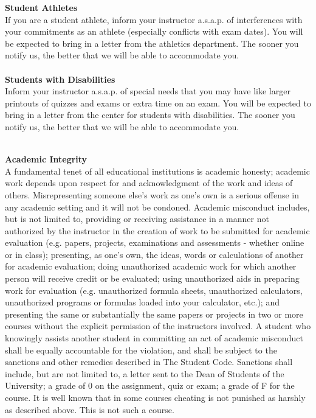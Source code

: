 \documentclass [11pt]{article}
\begin{document}
   {\bf Student Athletes}\\
   If you are a student athlete, inform your instructor a.s.a.p. of
   interferences with your commitments as an athlete (especially
   conflicts with exam dates). You will be expected to bring in a
   letter from the athletics department. The sooner you notify us, the
   better that we will be able to accommodate you.\\
   \ \\

   {\bf Students with Disabilities}\\
   Inform your instructor a.s.a.p. of special needs that you may have like
   larger printouts of quizzes and exams or extra time on an exam.
   You will be expected to bring in a letter from the center for students 
   with disabilities. The sooner you notify us, the better that we will 
   be able to accommodate you.\\
   \ \\

   \vfill\eject

   {\bf Academic Integrity}\\
   A fundamental tenet of all educational institutions is academic
   honesty; academic work depends upon respect for and acknowledgment of
   the work and ideas of others. Misrepresenting someone else's work as
   one's own is a serious offense in any academic setting and it will not
   be condoned.
   Academic misconduct includes, but is not limited to, providing or
   receiving assistance in a manner not authorized by the instructor in
   the creation of work to be submitted for academic evaluation (e.g.
   papers, projects, examinations and assessments - whether online or in
   class); presenting, as one's own, the ideas, words or calculations of
   another for academic evaluation; doing unauthorized academic work for
   which another person will receive credit or be evaluated; using
   unauthorized aids in preparing work for evaluation (e.g. unauthorized
   formula sheets, unauthorized calculators, unauthorized programs or
   formulas loaded into your calculator, etc.); and presenting the same
   or substantially the same papers or projects in two or more courses
   without the explicit permission of the instructors involved.
   A student who knowingly assists another student in committing an act
   of academic misconduct shall be equally accountable for the violation,
   and shall be subject to the sanctions and other remedies described in
   The Student Code. Sanctions shall include, but are not limited to, a
   letter sent to the Dean of Students of the University; a grade of 0 on
   the assignment, quiz or exam; a grade of F for the course.
   It is well known that in some courses cheating is not punished as
   harshly as described above. This is not such a course.\\
   \ \\
   
\end{document}
